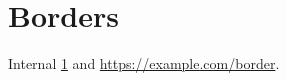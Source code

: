 \documentclass{article}
\begin{document}
\section{Borders}\label{sec:b}
Internal \ref{sec:b} and \url{https://example.com/border}.
\end{document}
